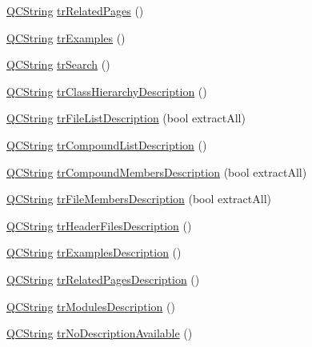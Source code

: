 \begin{DoxyCompactItemize}
\item 
\mbox{\hyperlink{class_q_c_string}{Q\+C\+String}} \mbox{\hyperlink{class_translator_polish_af2a7974597c3756f42cf593cadba6920}{tr\+Related\+Pages}} ()
\item 
\mbox{\hyperlink{class_q_c_string}{Q\+C\+String}} \mbox{\hyperlink{class_translator_polish_a3a9406c85bbeccb8e01f6ea4faa88d6e}{tr\+Examples}} ()
\item 
\mbox{\hyperlink{class_q_c_string}{Q\+C\+String}} \mbox{\hyperlink{class_translator_polish_abe0e787a56fad65f83063efce0ced680}{tr\+Search}} ()
\item 
\mbox{\hyperlink{class_q_c_string}{Q\+C\+String}} \mbox{\hyperlink{class_translator_polish_a853711c5e924af67e3b633ae7094fb86}{tr\+Class\+Hierarchy\+Description}} ()
\item 
\mbox{\hyperlink{class_q_c_string}{Q\+C\+String}} \mbox{\hyperlink{class_translator_polish_af5c5cd0b0e21fdd312b99ef67b923585}{tr\+File\+List\+Description}} (bool extract\+All)
\item 
\mbox{\hyperlink{class_q_c_string}{Q\+C\+String}} \mbox{\hyperlink{class_translator_polish_a778bd46cc4a34385a3ea7f12be1d8b75}{tr\+Compound\+List\+Description}} ()
\item 
\mbox{\hyperlink{class_q_c_string}{Q\+C\+String}} \mbox{\hyperlink{class_translator_polish_a91e0ccb09917a94f318d03886db20f3c}{tr\+Compound\+Members\+Description}} (bool extract\+All)
\item 
\mbox{\hyperlink{class_q_c_string}{Q\+C\+String}} \mbox{\hyperlink{class_translator_polish_a6c1c691bb7e8adf0623f93799e6e78b2}{tr\+File\+Members\+Description}} (bool extract\+All)
\item 
\mbox{\hyperlink{class_q_c_string}{Q\+C\+String}} \mbox{\hyperlink{class_translator_polish_aac416b1fd5ec343e0a3c9307b6ee1f43}{tr\+Header\+Files\+Description}} ()
\item 
\mbox{\hyperlink{class_q_c_string}{Q\+C\+String}} \mbox{\hyperlink{class_translator_polish_ab08c9c6f8e611a0d42e6984531a7259c}{tr\+Examples\+Description}} ()
\item 
\mbox{\hyperlink{class_q_c_string}{Q\+C\+String}} \mbox{\hyperlink{class_translator_polish_aaa1a0b407fe4a4f1b499392e23fcde07}{tr\+Related\+Pages\+Description}} ()
\item 
\mbox{\hyperlink{class_q_c_string}{Q\+C\+String}} \mbox{\hyperlink{class_translator_polish_af2cf868d7d5aa618ce1ddf5dca6c42b6}{tr\+Modules\+Description}} ()
\item 
\mbox{\hyperlink{class_q_c_string}{Q\+C\+String}} \mbox{\hyperlink{class_translator_polish_a78724c66bcd03325a32eeb56f2791307}{tr\+No\+Description\+Available}} ()

\end{DoxyCompactItemize}
